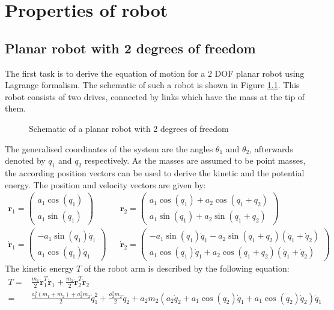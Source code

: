 \chapter{Properties of robot}
\section{Planar robot with 2 degrees of freedom}
The first task is to derive the equation of motion for a 2 \ac{DOF} planar robot using Lagrange formalism. The schematic of such a robot is shown in Figure \ref{fig:planar_robot_schematic}. This robot consists of two drives, connected by links which have the mass at the tip of them.
\begin{figure}[H]
	\centering
	
	\caption{Schematic of a planar robot with 2 degrees of freedom}
	\label{fig:planar_robot_schematic}
\end{figure}
The generalised coordinates of the system are the angles $\theta_1$ and $\theta_2$, afterwards denoted by $q_1$ and $q_2$ respectively. As the masses are assumed to be point masses, the according position vectors can be used to derive the kinetic and the potential energy. The position and velocity vectors are given by:
\begin{align*}
	\mathbf{r}_1 = \left(\begin{array}{c}
	a_1\cos(q_1)\\
	a_1\sin(q_1)
	\end{array}\right) && \mathbf{r}_2 = \left(\begin{array}{c}
	a_1\cos(q_1) + a_2\cos(q_1+q_2)\\
	a_1\sin(q_1) + a_2\sin(q_1+q_2)
	\end{array}\right)\\
	\dot{\mathbf{r}}_1 = \left(\begin{array}{c}
	-a_1\sin(q_1)\dot{q}_1\\
	a_1\cos(q_1)\dot{q}_1
	\end{array}\right) && \dot{\mathbf{r}}_2 = \left(\begin{array}{c}
	-a_1\sin(q_1)\dot{q}_1 - a_2\sin(q_1+q_2)(\dot{q}_1 + \dot{q}_2)\\
	a_1\cos(q_1)\dot{q}_1 + a_2\cos(q_1+q_2)(\dot{q}_1 + \dot{q}_2)
	\end{array}\right)
\end{align*}
The kinetic energy $T$ of the robot arm is described by the following equation:
\begin{align}
	T =& \frac{m_1}{2}\dot{\mathbf{r}}_1^T\dot{\mathbf{r}}_1 + \frac{m_2}{2}\dot{\mathbf{r}}_2^T\dot{\mathbf{r}}_2\nonumber\\
	=& \frac{a_1^2 (m_1 + m_2) + a_2^2 m_2}{2} \dot{q}_1^2 + \frac{a_2^2 m_2}{2} \dot{q}_2 + a_2m_2(a_2\dot{q}_2 + a_1\cos(q_2)\dot{q}_1 + a_1\cos(q_2)\dot{q}_2)\dot{q}_1
	\label{eq:ch1_kinetic}
\end{align}

